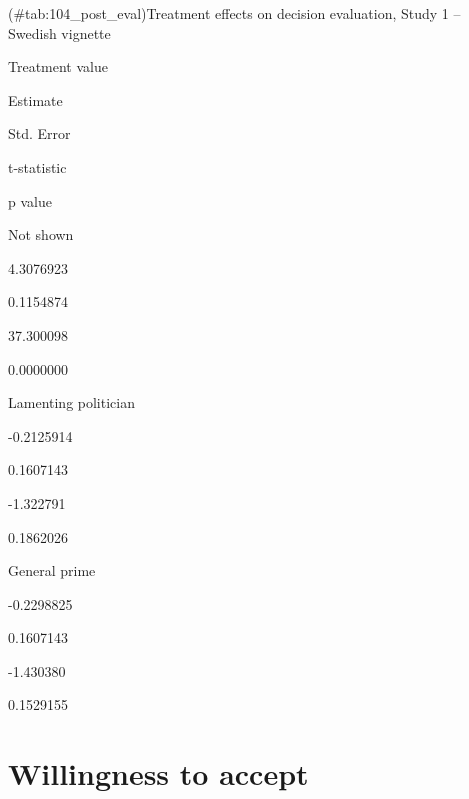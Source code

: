 \documentclass[]{book}
\begin{document}
(\#tab:104\_post\_eval)Treatment effects on decision evaluation, Study 1
-- Swedish vignette

Treatment value

Estimate

Std. Error

t-statistic

p value

Not shown

4.3076923

0.1154874

37.300098

0.0000000

Lamenting politician

-0.2125914

0.1607143

-1.322791

0.1862026

General prime

-0.2298825

0.1607143

-1.430380

0.1529155

\section{Willingness to accept}\label{willingness-to-accept}
\end{document}
